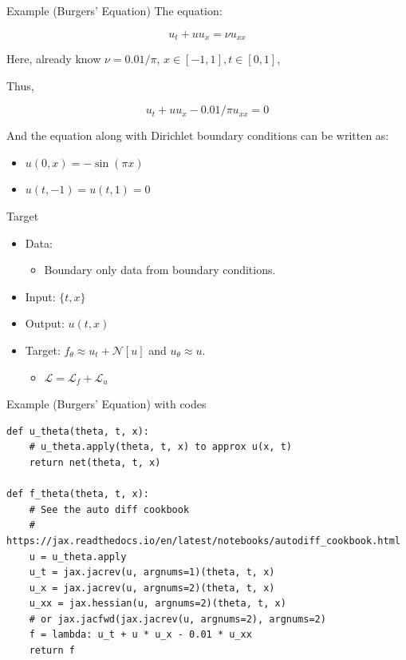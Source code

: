 \documentclass[aspectratio=1610,xcolor={dvipsnames},hyperref={colorlinks,unicode,linkcolor=violet,anchorcolor=BlueViolet,citecolor=YellowOrange,filecolor=black,urlcolor=Aquamarine}]{beamer}
\begin{document}
\begin{frame}[label={sec:org0a1c8d9}]{Example (Burgers' Equation)}
The equation:

\[u_t + u u_x = \nu u_{xx}\]

Here, already know \(\nu = 0.01 / \pi\), \(x \in [-1, 1], t \in [0, 1]\),

Thus,

\[u_{t} + uu_{x} - 0.01/\pi u_{xx} = 0 \]

And the equation along with Dirichlet boundary conditions can be written as:

\begin{itemize}
\item \(u(0, x) = -\sin(\pi x)\)
\item \(u(t, -1) = u(t, 1) = 0\)
\end{itemize}
\end{frame}

\begin{frame}[label={sec:org444c4dc}]{Target}
\begin{itemize}
\item Data:
\begin{itemize}
\item Boundary only data from boundary conditions.
\end{itemize}
\item Input: \(\{t, x\}\)
\item Output: \(u(t, x)\)
\item Target: \(f_{\theta} \approx u_{t} + \mathcal{N}[u]\) and \(u_{\theta} \approx u\).
\begin{itemize}
\item \(\mathcal{L} = \mathcal{L}_{f} + \mathcal{L}_{u}\)
\end{itemize}
\end{itemize}
\end{frame}

\begin{frame}[label={sec:org1d3afdf},fragile,containsverbatim]{Example (Burgers' Equation) with codes}
 \begin{verbatim}
def u_theta(theta, t, x):
    # u_theta.apply(theta, t, x) to approx u(x, t)
    return net(theta, t, x)

def f_theta(theta, t, x):
    # See the auto diff cookbook
    # https://jax.readthedocs.io/en/latest/notebooks/autodiff_cookbook.html
    u = u_theta.apply
    u_t = jax.jacrev(u, argnums=1)(theta, t, x)
    u_x = jax.jacrev(u, argnums=2)(theta, t, x)
    u_xx = jax.hessian(u, argnums=2)(theta, t, x)
    # or jax.jacfwd(jax.jacrev(u, argnums=2), argnums=2)
    f = lambda: u_t + u * u_x - 0.01 * u_xx
    return f
\end{verbatim}
\end{frame}
\end{document}
